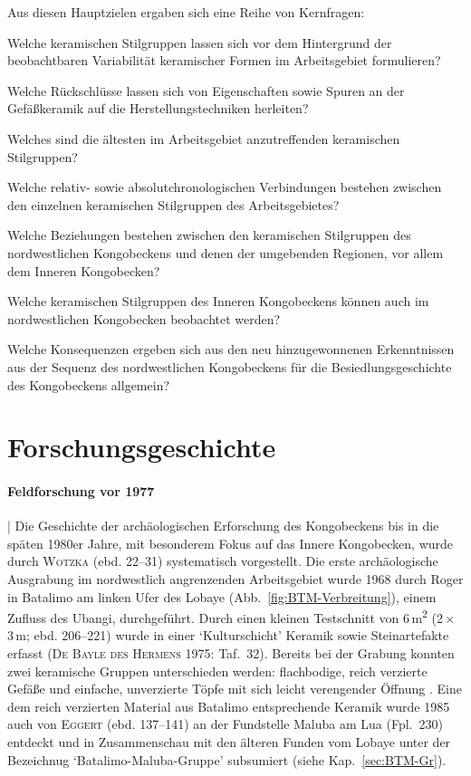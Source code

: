 \begin{multicols}{2}
\noindent Aus diesen Hauptzielen ergaben sich eine Reihe von Kernfragen:
\begin{itemize*}
\item Welche keramischen Stilgruppen lassen sich vor dem Hintergrund der beobachtbaren Variabilität keramischer Formen im Arbeitsgebiet formulieren?
\item Welche Rückschlüsse lassen sich von Eigenschaften sowie Spuren an der Gefäßkeramik auf die Herstellungstechniken herleiten?
\item Welches sind die ältesten im Arbeitsgebiet anzutreffenden keramischen Stilgruppen?
\item Welche relativ- sowie absolutchronologischen Verbindungen bestehen zwischen den einzelnen keramischen Stilgruppen des Arbeitsgebietes?
\item Welche Beziehungen bestehen zwischen den keramischen Stilgruppen des nordwestlichen Kongobeckens und denen der umgebenden Regionen, vor allem dem Inneren Kongobecken?
\item Welche keramischen Stilgruppen des Inneren Kongobeckens können auch im nordwestlichen Kongobecken beobachtet werden?
\item Welche Konsequenzen ergeben sich aus den neu hinzugewonnenen Erkenntnissen aus der Sequenz des nordwestlichen Kongobeckens für die Besiedlungsgeschichte des Kongobeckens allgemein?
\end{itemize*}

\section{Forschungsgeschichte}

\paragraph{Feldforschung vor 1977}\hspace{-.5em}|\hspace{.5em}%
Die Geschichte der archäologischen Erforschung des Kongobeckens bis in die späten 1980er Jahre, mit besonderem Fokus auf das Innere Kongobecken, wurde durch \textsc{Wotzka} (ebd. 22--31) systematisch vorgestellt. Die erste archäologische Ausgrabung im nordwestlich angrenzenden Arbeitsgebiet wurde 1968 durch Roger \textcite{deBayledesHermens.1975} in Batalimo am linken Ufer des Lobaye (Abb.~\ref{fig:BTM-Verbreitung}), einem Zufluss des \mbox{Ubangi}, durchgeführt. Durch einen kleinen Testschnitt von 6\,m\textsuperscript{2} (2\,\( \times \)\,3\,m; ebd. 206--221) wurde in einer \enquote*{Kulturschicht} Keramik sowie Steinartefakte erfasst (\textsc{De Bayle des Hermens} 1975: Taf.~32). Bereits bei der Grabung konnten zwei keramische Gruppen unterschieden werden: flachbodige, reich verzierte Gefäße und einfache, unverzierte Töpfe mit sich leicht verengender Öffnung \parencites[224, 234]{Aumassip.1975}[134]{Eggert.1987c}. Eine dem reich verzierten Material aus Batalimo entsprechende Keramik wurde 1985 auch von \textsc{Eggert} (ebd. 137--141) an der Fundstelle Maluba am Lua (Fpl.~230) entdeckt und in Zusammenschau mit den älteren Funden vom Lobaye unter der Bezeichnug \enquote*{Batalimo-Maluba-Gruppe} subsumiert (siehe Kap.~\ref{sec:BTM-Gr}).


\end{multicols}

